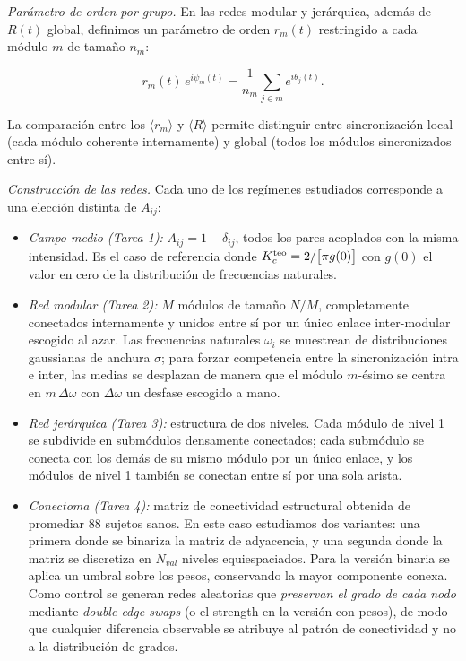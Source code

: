 \documentclass[
  reprint,
  amsmath,amssymb,
  aps,
  pra,
]{revtex4-2}
\begin{document}
\textit{Parámetro de orden por grupo.}\;
En las redes modular y jerárquica, además de \(R(t)\) global, definimos un parámetro de orden \(r_m(t)\) restringido a cada módulo \(m\) de tamaño \(n_m\):

\begin{equation}
  r_m(t)\,e^{i\psi_m(t)} = \frac{1}{n_m}\sum_{j\in m} e^{i\theta_j(t)}.
  \label{eq:r_grupo}
\end{equation}

La comparación entre los \(\langle r_m\rangle\) y \(\langle R\rangle\) permite distinguir entre sincronización local (cada módulo coherente internamente) y global (todos los módulos sincronizados entre sí).

\textit{Construcción de las redes.}\;
Cada uno de los regímenes estudiados corresponde a una elección distinta de \(A_{ij}\):

\begin{itemize}
\item \textit{Campo medio (Tarea 1):} \(A_{ij} = 1 - \delta_{ij}\), todos los pares acoplados con la misma intensidad. Es el caso de referencia donde \(K_c^{\rm teo} = 2/\bigl[\pi g(0)\bigr]\) con \(g(0)\) el valor en cero de la distribución de frecuencias naturales.

\item \textit{Red modular (Tarea 2):} \(M\) módulos de tamaño \(N/M\), completamente conectados internamente y unidos entre sí por un único enlace inter-modular escogido al azar. Las frecuencias naturales \(\omega_i\) se muestrean de distribuciones gaussianas de anchura \(\sigma\); para forzar competencia entre la sincronización intra e inter, las medias se desplazan de manera que el módulo \(m\)-ésimo se centra en \(m\,\Delta\omega\) con \(\Delta\omega\) un desfase escogido a mano.

\item \textit{Red jerárquica (Tarea 3):} estructura de dos niveles. Cada módulo de nivel 1 se subdivide en submódulos densamente conectados; cada submódulo se conecta con los demás de su mismo módulo por un único enlace, y los módulos de nivel 1 también se conectan entre sí por una sola arista.

\item \textit{Conectoma (Tarea 4):} matriz de conectividad estructural obtenida de promediar 88 sujetos sanos. En este caso estudiamos dos variantes: una primera donde se binariza la matriz de adyacencia, y una segunda donde la matriz se discretiza en \(N_{val}\) niveles equiespaciados. Para la versión binaria se aplica un umbral sobre los pesos, conservando la mayor componente conexa. Como control se generan redes aleatorias que \textit{preservan el grado de cada nodo} mediante \textit{double-edge swaps} (o el strength en la versión con pesos), de modo que cualquier diferencia observable se atribuye al patrón de conectividad y no a la distribución de grados.
\end{itemize}
\end{document}
